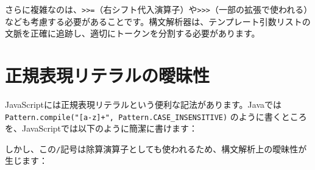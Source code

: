 \begin{Shaded}
\begin{Highlighting}[]
\NormalTok{, }
\end{Highlighting}
\end{Shaded}

さらに複雑なのは、\texttt{\textgreater{}\textgreater{}=}（右シフト代入演算子）や\texttt{\textgreater{}\textgreater{}\textgreater{}}（一部の拡張で使われる）なども考慮する必要があることです。構文解析器は、テンプレート引数リストの文脈を正確に追跡し、適切にトークンを分割する必要があります。

\hypertarget{chapter7-ux6b63ux898fux8868ux73feux30eaux30c6ux30e9ux30ebux306eux66d6ux6627ux6027}{%
\section{正規表現リテラルの曖昧性}\label{chapter7-ux6b63ux898fux8868ux73feux30eaux30c6ux30e9ux30ebux306eux66d6ux6627ux6027}}

JavaScriptには正規表現リテラルという便利な記法があります。Javaでは
\texttt{Pattern.compile("{[}a-z{]}+",\ Pattern.CASE\_INSENSITIVE)}
のように書くところを、JavaScriptでは以下のように簡潔に書けます：

\begin{Shaded}
\begin{Highlighting}[]
\OperatorTok{=} \SpecialStringTok{/}\SpecialCharTok{[a{-}z]+}\OperatorTok{;}  
\end{Highlighting}
\end{Shaded}

しかし、この\texttt{/}記号は除算演算子としても使われるため、構文解析上の曖昧性が生じます：

\begin{Shaded}
\begin{Highlighting}[]
\OperatorTok{=} \SpecialCharTok{+}\OperatorTok{;}

\OperatorTok{=}\OperatorTok{/}\OperatorTok{+}\OperatorTok{/}\OperatorTok{;}
\end{Highlighting}
\end{Shaded}

